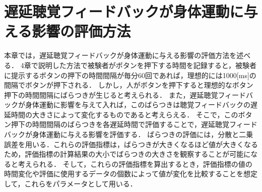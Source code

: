 \chapter{遅延聴覚フィードバックが身体運動に与える影響の評価方法}
本章では，遅延聴覚フィードバックが身体運動に与える影響の評価方法を述べる．
4章で説明した方法で被験者がボタンを押下する時間を記録すると，被験者に提示するボタンの押下の時間間隔が毎分60回であれば，理想的には1000[ms]の間隔でボタンが押下される．
しかし，人がボタンを押下すると理想的なボタン押下の時間間隔にばらつきが生じると考えられる．
また，遅延聴覚フィードバックが身体運動に影響を与えて入れば，このばらつきは聴覚フィードバックの遅延時間の大きさによって変化するものであると考えらえる．
そこで，このボタン押下の時間間隔のばらつきを各遅延時間で評価することで，遅延聴覚フィードバックが身体運動に与える影響を評価する．
ばらつきの評価には，分散と二乗誤差を用いる．これらの評価指標は，ばらつきが大きくなるほど値が大きくなるため，評価指標の計算結果の大小でばらつきの大きさを観察することが可能になると考えられる．
そして，これらの評価指標を算出するとき，評価指標の値の時間変化や評価に使用するデータの個数によって値が変化を比較することを想定して，これらをパラメータとして用いる．
